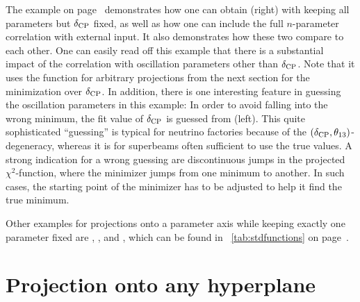 The example on page~\pageref{ex:corrproj} demonstrates how one can obtain  (right) with keeping all parameters but $\delta_{\mathrm{CP}}$ fixed, as well as how one can include the full $n$-parameter correlation with external input. It also demonstrates how these two compare to each other. One can easily read off this example that 
there is a substantial impact of the
correlation with oscillation parameters other than $\delta_{\mathrm{CP}}$. 
Note that it uses the function
 for arbitrary projections from the next section for the minimization over $\delta_{\mathrm{CP}}$.
In addition, there is one interesting feature in guessing the
oscillation parameters in this example: In order to avoid falling
into the wrong minimum, the fit value of $\delta_{\mathrm{CP}}$ is guessed from  (left). This quite sophisticated ``guessing'' is typical
for neutrino factories because of the $(\delta_{\mathrm{CP}}, \theta_{13})$-degeneracy, whereas it is for superbeams often sufficient
to use the true values. A strong indication for a wrong guessing 
are discontinuous jumps in the projected $\chi^2$-function, where the minimizer jumps from one minimum to another. In such cases, the starting point of the minimizer has to be adjusted to help it find the true minimum.

Other examples for projections onto a parameter axis while keeping exactly one parameter fixed are , , and , which
can be found in \Tab~\ref{tab:stdfunctions} on page~\pageref{tab:stdfunctions}.


\section[Projection onto any hyperplane]{Projection onto any hyperplane}

